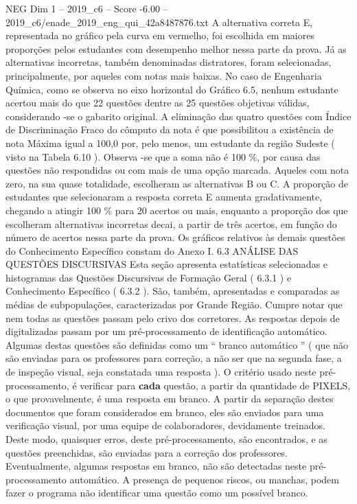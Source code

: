 \begin{textsample}{NEG Dim 1 – 2019\_c6 – Score -6.00 – 2019\_c6/enade\_2019\_eng\_qui\_42a8487876.txt}
A alternativa correta E, representada no gráfico pela curva em vermelho, foi escolhida em maiores proporções pelos estudantes com desempenho melhor nessa parte da prova.
Já as alternativas incorretas, também denominadas distratores, foram selecionadas, principalmente, por aqueles com notas mais baixas.
No caso de Engenharia Química, como se observa no eixo horizontal do Gráfico 6.5, nenhum estudante acertou mais do que 22 questões dentre as 25 questões objetivas válidas, considerando -se o gabarito original.
A eliminação das quatro questões com Índice de Discriminação Fraco do cômputo da nota é que possibilitou a existência de nota Máxima igual a 100,0 por, pelo menos, um estudante da região Sudeste ( visto na Tabela 6.10 ).
Observa -se que a soma não é 100 \%, por causa das questões não respondidas ou com mais de uma opção marcada.
Aqueles com nota zero, na sua quase totalidade, escolheram as alternativas B ou C.
A proporção de estudantes que selecionaram a resposta correta E aumenta gradativamente, chegando a atingir 100 \% para 20 acertos ou mais, enquanto a proporção dos que escolheram alternativas incorretas decai, a partir de três acertos, em função do número de acertos nessa parte da prova.
Os gráficos relativos às demais questões do Conhecimento Específico constam do Anexo I. 6.3 ANÁLISE DAS QUESTÕES DISCURSIVAS Esta seção apresenta estatísticas selecionadas e histogramas das Questões Discursivas de Formação Geral ( 6.3.1 ) e Conhecimento Específico ( 6.3.2 ).
São, também, apresentadas e comparadas as médias de subpopulações, caracterizadas por Grande Região.
Cumpre notar que nem todas as questões passam pelo crivo dos corretores.
As respostas depois de digitalizadas passam por um pré-processamento de identificação automático.
Algumas destas questões são definidas como um “ branco automático ” ( que não são enviadas para os professores para correção, a não ser que na segunda fase, a de inspeção visual, seja constatada uma resposta ).
O critério usado neste pré-processamento, é verificar para \textbf{cada} questão, a partir da quantidade de PIXELS, o que provavelmente, é uma resposta em branco.
A partir da separação destes documentos que foram considerados em branco, eles são enviados para uma verificação visual, por uma equipe de colaboradores, devidamente treinados.
Deste modo, quaisquer erros, deste pré-processamento, são encontrados, e as questões preenchidas, são enviadas para a correção dos professores.
Eventualmente, algumas respostas em branco, não são detectadas neste pré-processamento automático.
A presença de pequenos riscos, ou manchas, podem fazer o programa não identificar uma questão como um possível branco.

\end{textsample}
